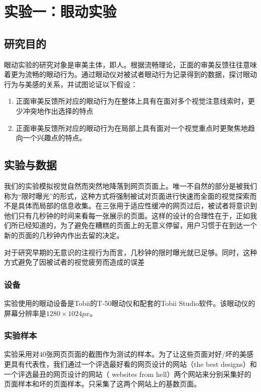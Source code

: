 \chapter{实验一：眼动实验}
\label{exp1}

\section{研究目的}
眼动实验的研究对象是审美主体，即人。根据流畅理论，正面的审美反馈往往意味着更为流畅的眼动行为。通过眼动仪对被试者眼动行为记录得到的数据，探讨眼动行为与美感的关系，并试图论证以下假设：

\begin{enumerate}
  \item 正面审美反馈所对应的眼动行为在整体上具有在面对多个视觉注意线索时，更少冲突地作出选择的特点
  \item 正面审美反馈所对应的眼动行为在局部上具有面对一个视觉重点时更聚焦地趋向一个兴趣点的特点。
\end{enumerate}

\section{实验与数据}
我们的实验模拟视觉自然而突然地降落到网页页面上。唯一不自然的部分是被我们称为“限时曝光”的形式，这种方式将强制被试对页面进行快速而全面的视觉探索而不是具体而局部的信息收集。在三张用于适应性缓冲的网页过后，被试者将意识到他们只有几秒钟的时间来看每一张展示的页面。这样的设计的合理性在于，正如我们所已经知道的，为了避免在糟糕的页面上的无意义停留，用户习惯于在到达一个新的页面的几秒钟内作出去留的决定。

对于研究早期的无意识的注视行为而言，几秒钟的限时曝光就已足够。同时，这种方式避免了因被试者的视觉疲劳而造成的误差

\subsection{设备}
实验使用的眼动设备是Tobii的T-50眼动仪和配套的Tobii Studio软件。该眼动仪的屏幕分辨率是$1280\times1024px$。

\subsection{实验样本}
实验采用对40张网页页面的截图作为测试的样本。为了让这些页面对好/坏的美感更具有代表性，我们通过一个评选最好看的网页设计的网站（the best designs\footnotemark[1]）和一个评选最丑的网页设计的网站（ websites from hell\footnotemark[2]）两个网站来分别采集好的页面样本和坏的页面样本。只采集了这两个网站上的基数页面。

